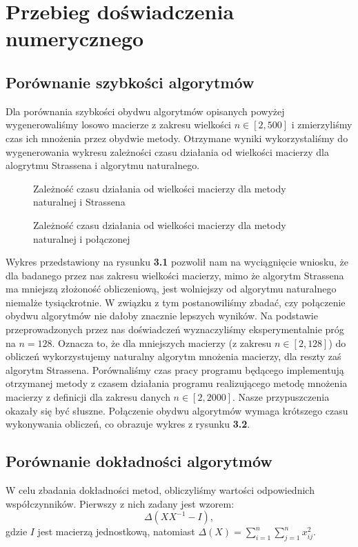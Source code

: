\section{Przebieg doświadczenia numerycznego}
\subsection{Porównanie szybkości algorytmów}
Dla porównania szybkości obydwu algorytmów opisanych powyżej wygenerowaliśmy
losowo macierze z zakresu wielkości $n \in [2, 500]$ i zmierzyliśmy czas ich
mnożenia przez obydwie metody. Otrzymane wyniki wykorzystaliśmy do wygenerowania wykresu zależności
czasu działania od wielkości macierzy dla alogrytmu Strassena i algorytmu
naturalnego.
\begin{figure}[h!tb]
\begin{center}

\caption{Zależność czasu działania od wielkości macierzy dla metody naturalnej i Strassena}
\end{center}
\end{figure}
\begin{figure}[h!tb]
\begin{center}

\caption{Zależność czasu działania od wielkości macierzy dla metody naturalnej i połączonej}
\end{center}
\end{figure}
Wykres przedstawiony na rysunku \textbf{3.1} pozwolił nam na wyciągnięcie wniosku, że dla badanego przez nas
zakresu wielkości macierzy, mimo że algorytm Strassena ma mniejszą złożoność
obliczeniową, jest wolniejszy od algorytmu naturalnego niemalże tysiąckrotnie. W związku z tym
postanowiliśmy zbadać, czy połączenie obydwu algorytmów nie dałoby znacznie
lepszych wyników. Na podstawie przeprowadzonych przez nas doświadczeń wyznaczyliśmy eksperymentalnie
próg na $n=128$. Oznacza to, że dla mniejszych macierzy (z zakresu
$n \in [2, 128]$) do obliczeń wykorzystujemy naturalny algorytm mnożenia macierzy,
dla reszty zaś algorytm Strassena. Porównaliśmy czas pracy programu będącego
implementują otrzymanej metody z czasem działania programu realizującego metodę
mnożenia macierzy z definicji dla zakresu danych $n \in [2, 2000]$. Nasze przypuszczenia okazały się być słuszne.
Połączenie obydwu algorytmów wymaga krótszego czasu wykonywania obliczeń, co obrazuje wykres z rysunku \textbf{3.2}.
\subsection{Porównanie dokładności algorytmów}
W celu zbadania dokładności metod, obliczyliśmy wartości odpowiednich
współczynników. Pierwszy z nich zadany jest wzorem:
$$\Delta(XX^{-1}-I),$$
gdzie $I$ jest macierzą jednostkową, natomiast $\Delta(X) = \sum_{i=1}^{n}
\sum_{j=1}^{n} x_{ij}^2.$

